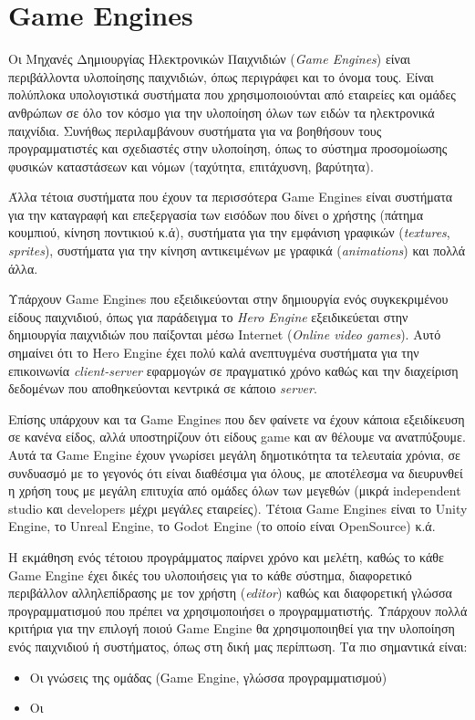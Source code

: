 \section{Game Engines}
Οι Μηχανές Δημιουργίας Ηλεκτρονικών Παιχνιδιών (\textit{Game Engines}) είναι περιβάλλοντα υλοποίησης παιχνιδιών, όπως περιγράφει και το όνομα τους. Είναι πολύπλοκα υπολογιστικά συστήματα που χρησιμοποιούνται από εταιρείες και ομάδες ανθρώπων σε όλο τον κόσμο για την υλοποίηση όλων των ειδών τα ηλεκτρονικά παιχνίδια. Συνήθως περιλαμβάνουν συστήματα για να βοηθήσουν τους προγραμματιστές και σχεδιαστές στην υλοποίηση, όπως το σύστημα προσομοίωσης φυσικών καταστάσεων και νόμων (ταχύτητα, επιτάχυσνη, βαρύτητα).
\par
Άλλα τέτοια συστήματα που έχουν τα περισσότερα Game Engines είναι συστήματα για την καταγραφή και επεξεργασία των εισόδων που δίνει ο χρήστης (πάτημα κουμπιού, κίνηση ποντικιού κ.ά), συστήματα για την εμφάνιση γραφικών (\textit{textures}, \textit{sprites}), συστήματα για την κίνηση αντικειμένων με γραφικά (\textit{animations}) και πολλά άλλα.
\par
Υπάρχουν Game Engines που εξειδικεύονται στην δημιουργία ενός συγκεκριμένου είδους παιχνιδιού, όπως για παράδειγμα το \textit{Hero Engine} εξειδικεύεται στην δημιουργία παιχνιδιών που παίξονται μέσω Internet (\textit{Online video games}). Αυτό σημαίνει ότι το Hero Engine έχει πολύ καλά ανεπτυγμένα συστήματα για την επικοινωνία \textit{client-server} εφαρμογών σε πραγματικό χρόνο καθώς και την διαχείριση δεδομένων που αποθηκεύονται κεντρικά σε κάποιο \textit{server}.
\par
Επίσης υπάρχουν και τα Game Engines που δεν φαίνετε να έχουν κάποια εξειδίκευση σε κανένα είδος, αλλά υποστηρίζουν ότι είδους game και αν θέλουμε να ανατπύξουμε. Αυτά τα Game Engine έχουν γνωρίσει μεγάλη δημοτικότητα τα τελευταία χρόνια, σε συνδυασμό με το γεγονός ότι είναι διαθέσιμα για όλους, με αποτέλεσμα να διευρυνθεί η χρήση τους με μεγάλη επιτυχία από ομάδες όλων των μεγεθών (μικρά independent studio και developers μέχρι μεγάλες εταιρείες). Τέτοια Game Engines είναι το Unity Engine, το Unreal Engine, το Godot Engine (το οποίο είναι OpenSource) κ.ά.
\par
Η εκμάθηση ενός τέτοιου προγράμματος παίρνει χρόνο και μελέτη, καθώς το κάθε Game Engine έχει δικές του υλοποιήσεις για το κάθε σύστημα, διαφορετικό περιβάλλον αλληλεπίδρασης με τον χρήστη (\textit{editor}) καθώς και διαφορετική γλώσσα προγραμματισμού που πρέπει να χρησιμοποιήσει ο προγραμματιστής. Υπάρχουν πολλά κριτήρια για την επιλογή ποιού Game Engine θα χρησιμοποιηθεί για την υλοποίηση ενός παιχνιδιού ή συστήματος, όπως στη δική μας περίπτωση. Τα πιο σημαντικά είναι:
\begin{itemize}
  \item Οι γνώσεις της ομάδας (Game Engine, γλώσσα προγραμματισμού)
  \item Οι
\end{itemize}

